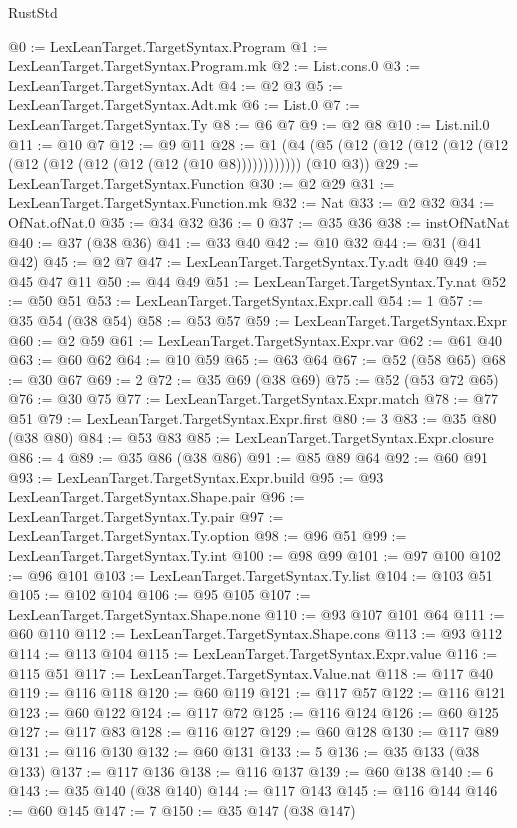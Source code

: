 \begin{lexlean}{RustStd}
\begin{coremodule}
@0 := LexLeanTarget.TargetSyntax.Program
@1 := LexLeanTarget.TargetSyntax.Program.mk
@2 := List.cons.{0}
@3 := LexLeanTarget.TargetSyntax.Adt
@4 := @2 @3
@5 := LexLeanTarget.TargetSyntax.Adt.mk
@6 := List.{0}
@7 := LexLeanTarget.TargetSyntax.Ty
@8 := @6 @7
@9 := @2 @8
@10 := List.nil.{0}
@11 := @10 @7
@12 := @9 @11
@28 := @1 (@4 (@5 (@12 (@12 (@12 (@12 (@12 (@12 (@12 (@12 (@12 (@12 (@10 @8)))))))))))) (@10 @3))
@29 := LexLeanTarget.TargetSyntax.Function
@30 := @2 @29
@31 := LexLeanTarget.TargetSyntax.Function.mk
@32 := Nat
@33 := @2 @32
@34 := OfNat.ofNat.{0}
@35 := @34 @32
@36 := 0
@37 := @35 @36
@38 := instOfNatNat
@40 := @37 (@38 @36)
@41 := @33 @40
@42 := @10 @32
@44 := @31 (@41 @42)
@45 := @2 @7
@47 := LexLeanTarget.TargetSyntax.Ty.adt @40
@49 := @45 @47 @11
@50 := @44 @49
@51 := LexLeanTarget.TargetSyntax.Ty.nat
@52 := @50 @51
@53 := LexLeanTarget.TargetSyntax.Expr.call
@54 := 1
@57 := @35 @54 (@38 @54)
@58 := @53 @57
@59 := LexLeanTarget.TargetSyntax.Expr
@60 := @2 @59
@61 := LexLeanTarget.TargetSyntax.Expr.var
@62 := @61 @40
@63 := @60 @62
@64 := @10 @59
@65 := @63 @64
@67 := @52 (@58 @65)
@68 := @30 @67
@69 := 2
@72 := @35 @69 (@38 @69)
@75 := @52 (@53 @72 @65)
@76 := @30 @75
@77 := LexLeanTarget.TargetSyntax.Expr.match
@78 := @77 @51
@79 := LexLeanTarget.TargetSyntax.Expr.first
@80 := 3
@83 := @35 @80 (@38 @80)
@84 := @53 @83
@85 := LexLeanTarget.TargetSyntax.Expr.closure
@86 := 4
@89 := @35 @86 (@38 @86)
@91 := @85 @89 @64
@92 := @60 @91
@93 := LexLeanTarget.TargetSyntax.Expr.build
@95 := @93 LexLeanTarget.TargetSyntax.Shape.pair
@96 := LexLeanTarget.TargetSyntax.Ty.pair
@97 := LexLeanTarget.TargetSyntax.Ty.option
@98 := @96 @51
@99 := LexLeanTarget.TargetSyntax.Ty.int
@100 := @98 @99
@101 := @97 @100
@102 := @96 @101
@103 := LexLeanTarget.TargetSyntax.Ty.list
@104 := @103 @51
@105 := @102 @104
@106 := @95 @105
@107 := LexLeanTarget.TargetSyntax.Shape.none
@110 := @93 @107 @101 @64
@111 := @60 @110
@112 := LexLeanTarget.TargetSyntax.Shape.cons
@113 := @93 @112
@114 := @113 @104
@115 := LexLeanTarget.TargetSyntax.Expr.value
@116 := @115 @51
@117 := LexLeanTarget.TargetSyntax.Value.nat
@118 := @117 @40
@119 := @116 @118
@120 := @60 @119
@121 := @117 @57
@122 := @116 @121
@123 := @60 @122
@124 := @117 @72
@125 := @116 @124
@126 := @60 @125
@127 := @117 @83
@128 := @116 @127
@129 := @60 @128
@130 := @117 @89
@131 := @116 @130
@132 := @60 @131
@133 := 5
@136 := @35 @133 (@38 @133)
@137 := @117 @136
@138 := @116 @137
@139 := @60 @138
@140 := 6
@143 := @35 @140 (@38 @140)
@144 := @117 @143
@145 := @116 @144
@146 := @60 @145
@147 := 7
@150 := @35 @147 (@38 @147)

\end{coremodule}
\end{lexlean}
